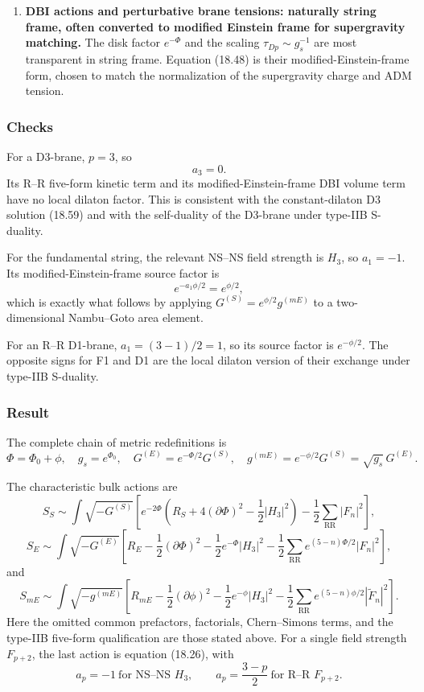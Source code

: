 \documentclass[
  10pt,
  a4paper,
  openany]{book}
\begin{document}
\begin{enumerate}
  \(\tau_{D1}^{(E)}\propto1/\sqrt{g_s}\). These would not be the
  scalings in the modified frame, whose asymptotic masses agree with
  string frame. Thus the special convention declared inside Section 18.5
  should not be silently extended to all later occurrences of the words
  ``Einstein frame.''
\item
  \textbf{DBI actions and perturbative brane tensions: naturally string
  frame, often converted to modified Einstein frame for supergravity
  matching.} The disk factor \(e^{-\Phi}\) and the scaling
  \(\tau_{Dp}\sim g_s^{-1}\) are most transparent in string frame.
  Equation (18.48) is their modified-Einstein-frame form, chosen to
  match the normalization of the supergravity charge and ADM tension.
\end{enumerate}

\subsubsection{Checks}\label{checks-30}

For a D3-brane, \(p=3\), so \[
a_3=0.
\] Its R--R five-form kinetic term and its modified-Einstein-frame DBI
volume term have no local dilaton factor. This is consistent with the
constant-dilaton D3 solution (18.59) and with the self-duality of the
D3-brane under type-IIB S-duality.

For the fundamental string, the relevant NS--NS field strength is
\(H_3\), so \(a_1=-1\). Its modified-Einstein-frame source factor is \[
e^{-a_1\phi/2}=e^{\phi/2},
\] which is exactly what follows by applying
\(G^{(S)}=e^{\phi/2}g^{(mE)}\) to a two-dimensional Nambu--Goto area
element.

For an R--R D1-brane, \(a_1=(3-1)/2=1\), so its source factor is
\(e^{-\phi/2}\). The opposite signs for F1 and D1 are the local dilaton
version of their exchange under type-IIB S-duality.

\subsubsection{Result}\label{result-36}

The complete chain of metric redefinitions is \[
\boxed{
\Phi=\Phi_0+\phi,
\quad g_s=e^{\Phi_0},
\quad
G^{(E)}=e^{-\Phi/2}G^{(S)},
\quad
g^{(mE)}=e^{-\phi/2}G^{(S)}
=\sqrt{g_s}\,G^{(E)}
}.
\]

The characteristic bulk actions are \[
\boxed{
S_S\sim\int\sqrt{-G^{(S)}}
\left[
e^{-2\Phi}\left(R_S+4(\partial\Phi)^2-\frac12|H_3|^2\right)
-\frac12\sum_{\mathrm{RR}}|F_n|^2
\right]
},
\] \[
\boxed{
S_E\sim\int\sqrt{-G^{(E)}}
\left[
R_E-\frac12(\partial\Phi)^2
-\frac12e^{-\Phi}|H_3|^2
-\frac12\sum_{\mathrm{RR}}e^{(5-n)\Phi/2}|F_n|^2
\right]
},
\] and \[
\boxed{
S_{mE}\sim\int\sqrt{-g^{(mE)}}
\left[
R_{mE}-\frac12(\partial\phi)^2
-\frac12e^{-\phi}|H_3|^2
-\frac12\sum_{\mathrm{RR}}e^{(5-n)\phi/2}|\widetilde F_n|^2
\right]
}.
\] Here the omitted common prefactors, factorials, Chern--Simons terms,
and the type-IIB five-form qualification are those stated above. For a
single field strength \(F_{p+2}\), the last action is equation (18.26),
with \[
\boxed{
a_p=-1\ \text{for NS--NS }H_3,
\qquad
a_p=\frac{3-p}{2}\ \text{for R--R }F_{p+2}
}.
\]
\end{document}
